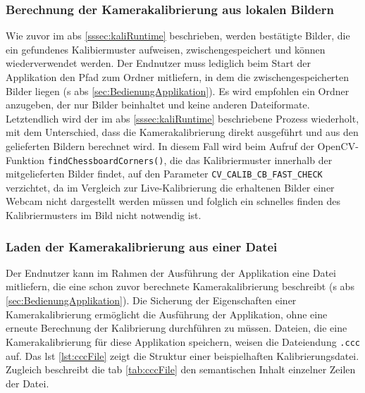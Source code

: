 \subsubsection{Berechnung der Kamerakalibrierung aus lokalen Bildern}\label{sssec:lokalkali}
Wie zuvor im \acs{abs} \ref{sssec:kaliRuntime} beschrieben, werden bestätigte Bilder, die ein gefundenes Kalibiermuster aufweisen, zwischengespeichert und können wiederverwendet werden. Der Endnutzer muss lediglich beim Start der Applikation den Pfad zum Ordner mitliefern, in dem die zwischengespeicherten Bilder liegen (\acs{s} \acs{abs} \ref{sec:BedienungApplikation}). Es wird empfohlen ein Ordner anzugeben, der nur Bilder beinhaltet und keine anderen Dateiformate. Letztendlich wird der im \acs{abs} \ref{sssec:kaliRuntime} beschriebene Prozess wiederholt, mit dem Unterschied, dass die Kamerakalibrierung direkt ausgeführt und aus den gelieferten Bildern berechnet wird. In diesem Fall wird beim Aufruf der OpenCV-Funktion \texttt{findChessboardCorners()}, die das Kalibriermuster innerhalb der mitgelieferten Bilder findet, auf den Parameter \texttt{CV\_CALIB\_CB\_FAST\_CHECK} verzichtet, da im Vergleich zur Live-Kalibrierung die erhaltenen Bilder einer Webcam nicht dargestellt werden müssen und folglich ein schnelles finden des Kalibriermusters im Bild nicht notwendig ist.

\subsubsection{Laden der Kamerakalibrierung aus einer Datei}\label{sssec:lokalfile}
Der Endnutzer kann im Rahmen der Ausführung der Applikation eine Datei mitliefern, die eine schon zuvor berechnete Kamerakalibrierung beschreibt (\acs{s} \acs{abs} \ref{sec:BedienungApplikation}). Die Sicherung der Eigenschaften einer Kamerakalibrierung ermöglicht die Ausführung der Applikation, ohne eine erneute Berechnung der Kalibrierung durchführen zu müssen. Dateien, die eine Kamerakalibrierung für diese Applikation speichern, weisen die Dateiendung \grqq \texttt{.ccc}\grqq{} auf. Das \acs{lst} \ref{lst:cccFile} zeigt die Struktur einer beispielhaften Kalibrierungsdatei. Zugleich beschreibt die \acs{tab} \ref{tab:cccFile} den semantischen Inhalt einzelner Zeilen der Datei.

